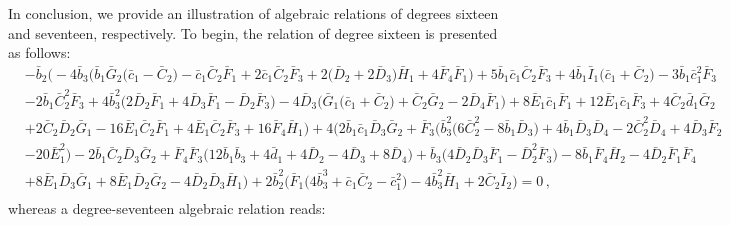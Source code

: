 \documentclass[10pt]{amsart}
\theoremstyle{definition}
\theoremstyle{corollary}
\theoremstyle{remark}
\theoremstyle{conclusion}
\begin{document}
In conclusion, we provide an illustration of algebraic relations of degrees sixteen and seventeen, respectively. To begin, the relation of degree sixteen is presented as follows:
\begin{align}
&-\bar{b}_2 \bigl(-4 \bar{b}_3 \bigl(\bar{b}_1 \bar{G}_2 \bigl(\bar{c}_1-\bar{C}_2\bigl)-\bar{c}_1 \bar{C}_2 \bar{F}_1+2 \bar{c}_1 \bar{C}_2 \bar{F}_3+2 \bigl(\bar{D}_2+2 \bar{D}_3\bigl) \bar{H}_1+4 \bar{F}_4 \bar{F}_1\bigl)+5 \bar{b}_1 \bar{c}_1 \bar{C}_2 \bar{F}_3+4 \bar{b}_1 \bar{I}_1 \bigl(\bar{c}_1+\bar{C}_2\bigl)-3 \bar{b}_1 \bar{c}_1^2 \bar{F}_3 \nonumber \\
&-2 \bar{b}_1 \bar{C}_2^2 \bar{F}_3+4 \bar{b}_3^2 \bigl(2 \bar{D}_2 \bar{F}_1+4 \bar{D}_3 \bar{F}_1-\bar{D}_2 \bar{F}_3\bigl)-4 \bar{D}_3 \bigl(\bar{G}_1 \bigl(\bar{c}_1+\bar{C}_2\bigl)+\bar{C}_2 \bar{G}_2-2 \bar{D}_4 \bar{F}_1\bigl)+8 \bar{E}_1 \bar{c}_1 \bar{F}_1+12 \bar{E}_1 \bar{c}_1 \bar{F}_3+4 \bar{C}_2 \bar{d}_1 \bar{G}_2 \nonumber \\
&+2 \bar{C}_2 \bar{D}_2 \bar{G}_1-16 \bar{E}_1 \bar{C}_2 \bar{F}_1+4 \bar{E}_1 \bar{C}_2 \bar{F}_3+16 \bar{F}_4 \bar{H}_1\bigl)+4 \bigl(2 \bar{b}_1 \bar{c}_1 \bar{D}_3 \bar{G}_2+\bar{F}_3 \bigl(\bar{b}_3^2 \bigl(6 \bar{C}_2^2-8 \bar{b}_1 \bar{D}_3\bigl)+4 \bar{b}_1 \bar{D}_3 \bar{D}_4-2 \bar{C}_2^2 \bar{D}_4+4 \bar{D}_3 \bar{F}_2 \nonumber \\
&-20 \bar{E}_1^2\bigl)-2 \bar{b}_1 \bar{C}_2 \bar{D}_3 \bar{G}_2+\bar{F}_4 \bar{F}_3 \bigl(12 \bar{b}_1 \bar{b}_3+4 \bar{d}_1+4 \bar{D}_2-4 \bar{D}_3+8 \bar{D}_4\bigl)+\bar{b}_3 \bigl(4 \bar{D}_2 \bar{D}_3 \bar{F}_1-\bar{D}_2^2 \bar{F}_3\bigl)-8 \bar{b}_1 \bar{F}_4 \bar{H}_2-4 \bar{D}_2 \bar{F}_1 \bar{F}_4\nonumber \\
&+8 \bar{E}_1 \bar{D}_3 \bar{G}_1+8 \bar{E}_1 \bar{D}_2 \bar{G}_2-4 \bar{D}_2 \bar{D}_3 \bar{H}_1\bigl)+2 \bar{b}_2^2 \bigl(\bar{F}_1 \bigl(4 \bar{b}_3^3+\bar{c}_1 \bar{C}_2-\bar{c}_1^2\bigl)-4 \bar{b}_3^2 \bar{H}_1+2 \bar{C}_2 \bar{I}_2\bigl)=0\nonumber \, , \\ 
\end{align}
whereas a degree-seventeen algebraic relation reads:
\end{document}

